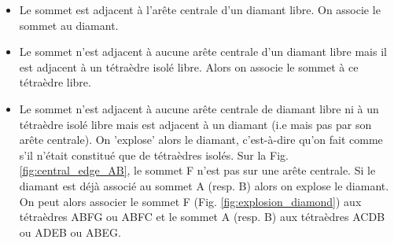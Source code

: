 \begin{itemize}
\item Le sommet est adjacent à l'arête centrale d'un diamant libre. On associe le sommet au diamant.
\item Le sommet n'est adjacent à aucune arête centrale d'un diamant libre mais il est adjacent à un tétraèdre isolé libre. Alors on associe le sommet à ce tétraèdre libre.
\item Le sommet n'est adjacent à aucune arête centrale de diamant libre ni à un tétraèdre isolé libre mais est adjacent à un diamant (i.e mais pas par son arête centrale). On 'explose' alors le diamant, c'est-à-dire qu'on fait comme s'il n'était constitué que de tétraèdres isolés. Sur la Fig. \ref{fig:central_edge_AB}, le sommet F n'est pas sur une arête centrale. Si le diamant est déjà associé au sommet A (resp. B) alors on explose le diamant. On peut alors associer le sommet F (Fig. \ref{fig:explosion_diamond}) aux tétraèdres ABFG ou ABFC et le sommet A (resp. B) aux tétraèdres ACDB ou ADEB ou ABEG.\\
\end{itemize}

